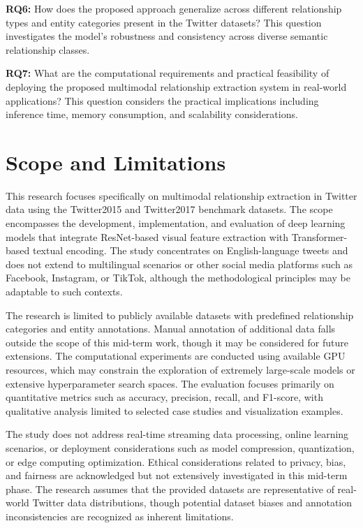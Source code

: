 \documentclass[12pt,a4paper]{report}
\begin{document}
\textbf{RQ6:} How does the proposed approach generalize across different relationship types and entity categories present in the Twitter datasets? This question investigates the model's robustness and consistency across diverse semantic relationship classes.

\textbf{RQ7:} What are the computational requirements and practical feasibility of deploying the proposed multimodal relationship extraction system in real-world applications? This question considers the practical implications including inference time, memory consumption, and scalability considerations.

\section{Scope and Limitations}

This research focuses specifically on multimodal relationship extraction in Twitter data using the Twitter2015 and Twitter2017 benchmark datasets. The scope encompasses the development, implementation, and evaluation of deep learning models that integrate ResNet-based visual feature extraction with Transformer-based textual encoding. The study concentrates on English-language tweets and does not extend to multilingual scenarios or other social media platforms such as Facebook, Instagram, or TikTok, although the methodological principles may be adaptable to such contexts.

The research is limited to publicly available datasets with predefined relationship categories and entity annotations. Manual annotation of additional data falls outside the scope of this mid-term work, though it may be considered for future extensions. The computational experiments are conducted using available GPU resources, which may constrain the exploration of extremely large-scale models or extensive hyperparameter search spaces. The evaluation focuses primarily on quantitative metrics such as accuracy, precision, recall, and F1-score, with qualitative analysis limited to selected case studies and visualization examples.

The study does not address real-time streaming data processing, online learning scenarios, or deployment considerations such as model compression, quantization, or edge computing optimization. Ethical considerations related to privacy, bias, and fairness are acknowledged but not extensively investigated in this mid-term phase. The research assumes that the provided datasets are representative of real-world Twitter data distributions, though potential dataset biases and annotation inconsistencies are recognized as inherent limitations.
\end{document}

